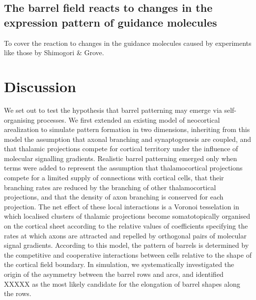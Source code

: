 \documentclass[9pt,twocolumn,twoside,lineno]{pnas-new}
\begin{document}
\subsection*{The barrel field reacts to changes in the expression pattern of guidance molecules}

To cover the reaction to changes in the guidance molecules caused by
experiments like those by Shimogori \& Grove.

\section*{Discussion}

We set out to test the hypothesis that barrel patterning may emerge via
self-organising processes. We first extended an existing model of neocortical
arealization to simulate pattern formation in two dimensions, inheriting from
this model the assumption that axonal branching and synaptogenesis are
coupled, and that thalamic projections compete for cortical territory under
the influence of molecular signalling gradients. Realistic barrel patterning
emerged only when terms were added to represent the assumption that
thalamocortical projections compete for a limited supply of connections with
cortical cells, that their branching rates are reduced by the branching of
other thalamocortical projections, and that the density of axon branching is
conserved for each projection. The net effect of these local interactions is a
Voronoi tesselation in which localised clusters of thalamic projections become
somatotopically organised on the cortical sheet according to the relative
values of coefficients specifying the rates at which axons are attracted and
repelled by orthogonal pairs of molecular signal gradients. According to this
model, the pattern of barrels is determined by the competitive and cooperative
interactions between cells relative to the shape of the cortical field
boundary. In simulation, we systematically investigated the origin of the
asymmetry between the barrel rows and arcs, and identified {\color{red} XXXXX}
as the most likely candidate for the elongation of barrel shapes along the
rows.


\end{document}
